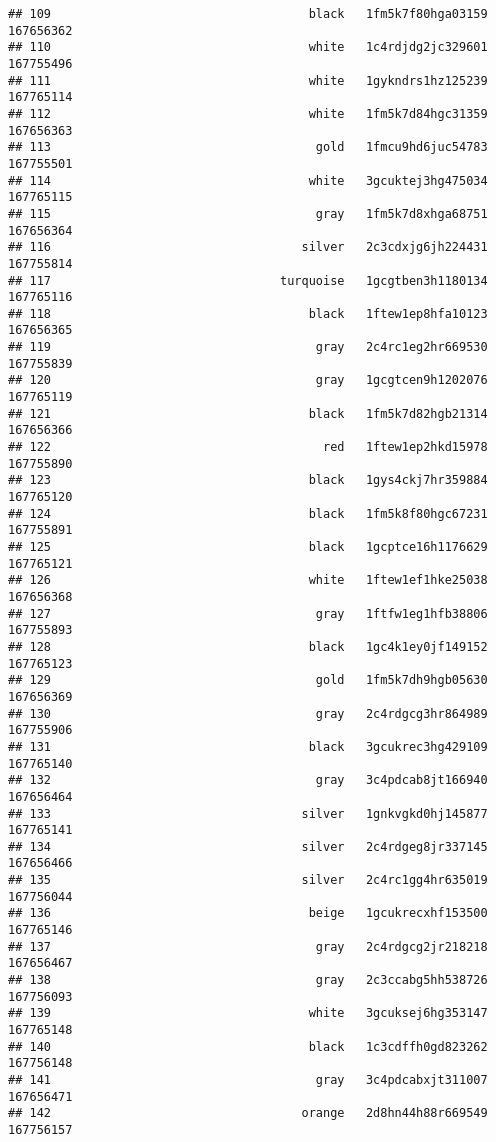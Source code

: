 \documentclass[
]{article}
\begin{document}
\begin{verbatim}
## 109                                    black   1fm5k7f80hga03159 167656362
## 110                                    white   1c4rdjdg2jc329601 167755496
## 111                                    white   1gykndrs1hz125239 167765114
## 112                                    white   1fm5k7d84hgc31359 167656363
## 113                                     gold   1fmcu9hd6juc54783 167755501
## 114                                    white   3gcuktej3hg475034 167765115
## 115                                     gray   1fm5k7d8xhga68751 167656364
## 116                                   silver   2c3cdxjg6jh224431 167755814
## 117                                turquoise   1gcgtben3h1180134 167765116
## 118                                    black   1ftew1ep8hfa10123 167656365
## 119                                     gray   2c4rc1eg2hr669530 167755839
## 120                                     gray   1gcgtcen9h1202076 167765119
## 121                                    black   1fm5k7d82hgb21314 167656366
## 122                                      red   1ftew1ep2hkd15978 167755890
## 123                                    black   1gys4ckj7hr359884 167765120
## 124                                    black   1fm5k8f80hgc67231 167755891
## 125                                    black   1gcptce16h1176629 167765121
## 126                                    white   1ftew1ef1hke25038 167656368
## 127                                     gray   1ftfw1eg1hfb38806 167755893
## 128                                    black   1gc4k1ey0jf149152 167765123
## 129                                     gold   1fm5k7dh9hgb05630 167656369
## 130                                     gray   2c4rdgcg3hr864989 167755906
## 131                                    black   3gcukrec3hg429109 167765140
## 132                                     gray   3c4pdcab8jt166940 167656464
## 133                                   silver   1gnkvgkd0hj145877 167765141
## 134                                   silver   2c4rdgeg8jr337145 167656466
## 135                                   silver   2c4rc1gg4hr635019 167756044
## 136                                    beige   1gcukrecxhf153500 167765146
## 137                                     gray   2c4rdgcg2jr218218 167656467
## 138                                     gray   2c3ccabg5hh538726 167756093
## 139                                    white   3gcuksej6hg353147 167765148
## 140                                    black   1c3cdffh0gd823262 167756148
## 141                                     gray   3c4pdcabxjt311007 167656471
## 142                                   orange   2d8hn44h88r669549 167756157

\end{verbatim}
\end{document}
